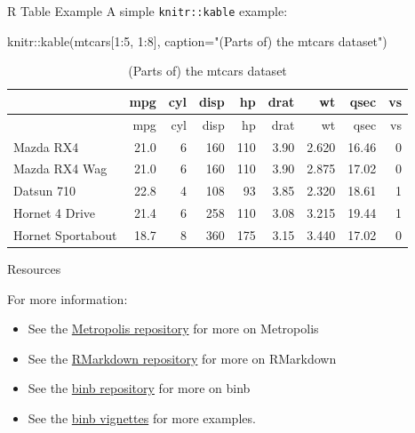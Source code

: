 \documentclass[12pt,ignorenonframetext,]{beamer}
\newenvironment{Shaded}{\begin{snugshade}}{\end{snugshade}}
\newcommand{\AttributeTok}[1]{\textcolor[rgb]{0.77,0.63,0.00}{#1}}
\newcommand{\DecValTok}[1]{\textcolor[rgb]{0.00,0.00,0.81}{#1}}
\newcommand{\FunctionTok}[1]{\textcolor[rgb]{0.00,0.00,0.00}{#1}}
\newcommand{\NormalTok}[1]{#1}
\newcommand{\SpecialCharTok}[1]{\textcolor[rgb]{0.00,0.00,0.00}{#1}}
\newcommand{\StringTok}[1]{\textcolor[rgb]{0.31,0.60,0.02}{#1}}
\providecommand{\tightlist}{%
  \setlength{\itemsep}{0pt}\setlength{\parskip}{0pt}}
\begin{document}
\begin{frame}[fragile]{R Table Example}
\protect\hypertarget{r-table-example}{}
A simple \texttt{knitr::kable} example:

\begin{Shaded}
\begin{Highlighting}[]
\NormalTok{knitr}\SpecialCharTok{::}\FunctionTok{kable}\NormalTok{(mtcars[}\DecValTok{1}\SpecialCharTok{:}\DecValTok{5}\NormalTok{, }\DecValTok{1}\SpecialCharTok{:}\DecValTok{8}\NormalTok{],}
             \AttributeTok{caption=}\StringTok{"(Parts of) the mtcars dataset"}\NormalTok{)}
\end{Highlighting}
\end{Shaded}

\begin{longtable}[]{@{}lrrrrrrrr@{}}
\caption{(Parts of) the mtcars dataset}\tabularnewline
\toprule
& mpg & cyl & disp & hp & drat & wt & qsec & vs\tabularnewline
\midrule
\endfirsthead
\toprule
& mpg & cyl & disp & hp & drat & wt & qsec & vs\tabularnewline
\midrule
\endhead
Mazda RX4 & 21.0 & 6 & 160 & 110 & 3.90 & 2.620 & 16.46 &
0\tabularnewline
Mazda RX4 Wag & 21.0 & 6 & 160 & 110 & 3.90 & 2.875 & 17.02 &
0\tabularnewline
Datsun 710 & 22.8 & 4 & 108 & 93 & 3.85 & 2.320 & 18.61 &
1\tabularnewline
Hornet 4 Drive & 21.4 & 6 & 258 & 110 & 3.08 & 3.215 & 19.44 &
1\tabularnewline
Hornet Sportabout & 18.7 & 8 & 360 & 175 & 3.15 & 3.440 & 17.02 &
0\tabularnewline
\bottomrule
\end{longtable}
\end{frame}

\begin{frame}{Resources}
\protect\hypertarget{resources}{}
\begin{block}{For more information:}
\protect\hypertarget{for-more-information}{}
\begin{itemize}
\tightlist
\item
  See the \href{https://github.com/matze/mtheme}{Metropolis repository}
  for more on Metropolis
\item
  See the \href{https://github.com/rstudio/rmarkdown}{RMarkdown
  repository} for more on RMarkdown
\item
  See the \href{https://github.com/eddelbuettel/binb}{binb repository}
  for more on binb
\item
  See the \href{https://github.com/eddelbuettel/binb/vignettes}{binb
  vignettes} for more examples.
\end{itemize}
\end{block}
\end{frame}
\end{document}
